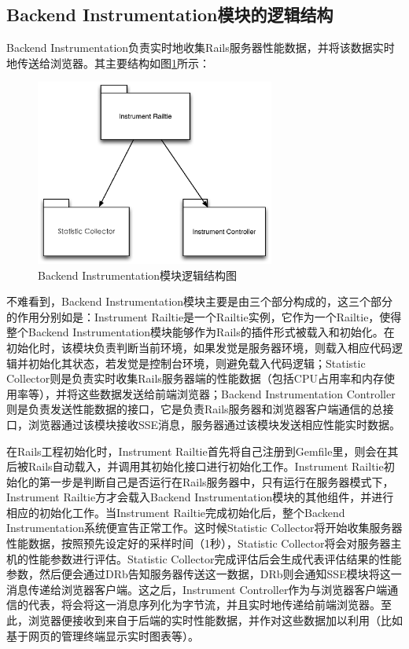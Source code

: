 \subsection{Backend Instrumentation模块的逻辑结构}
Backend Instrumentation负责实时地收集Rails服务器性能数据，并将该数据实时地传送给浏览器。其主要结构如图\ref{fig-instrument-struct}所示：

\begin{figure}[h]
\centering
\includegraphics[width=0.7\textwidth]{images/overview/instrument_struct.eps}
\caption{Backend Instrumentation模块逻辑结构图}
\label{fig-instrument-struct}
\end{figure}

不难看到，Backend Instrumentation模块主要是由三个部分构成的，这三个部分的作用分别如是：Instrument Railtie是一个Railtie实例，它作为一个Railtie，使得整个Backend Instrumentation模块能够作为Rails的插件形式被载入和初始化。在初始化时，该模块负责判断当前环境，如果发觉是服务器环境，则载入相应代码逻辑并初始化其状态，若发觉是控制台环境，则避免载入代码逻辑；Statistic Collector则是负责实时收集Rails服务器端的性能数据（包括CPU占用率和内存使用率等），并将这些数据发送给前端浏览器；Backend Instrumentation Controller则是负责发送性能数据的接口，它是负责Rails服务器和浏览器客户端通信的总接口，浏览器通过该模块接收SSE消息，服务器通过该模块发送相应性能实时数据。

在Rails工程初始化时，Instrument Railtie首先将自己注册到Gemfile里，则会在其后被Rails自动载入，并调用其初始化接口进行初始化工作。Instrument Railtie初始化的第一步是判断自己是否运行在Rails服务器中，只有运行在服务器模式下，Instrument Railtie方才会载入Backend Instrumentation模块的其他组件，并进行相应的初始化工作。当Instrument Railtie完成初始化后，整个Backend Instrumentation系统便宣告正常工作。这时候Statistic Collector将开始收集服务器性能数据，按照预先设定好的采样时间（1秒），Statistic Collector将会对服务器主机的性能参数进行评估。Statistic Collector完成评估后会生成代表评估结果的性能参数，然后便会通过DRb告知服务器传送这一数据，DRb则会通知SSE模块将这一消息传递给浏览器客户端。这之后，Instrument Controller作为与浏览器客户端通信的代表，将会将这一消息序列化为字节流，并且实时地传递给前端浏览器。至此，浏览器便接收到来自于后端的实时性能数据，并作对这些数据加以利用（比如基于网页的管理终端显示实时图表等）。



